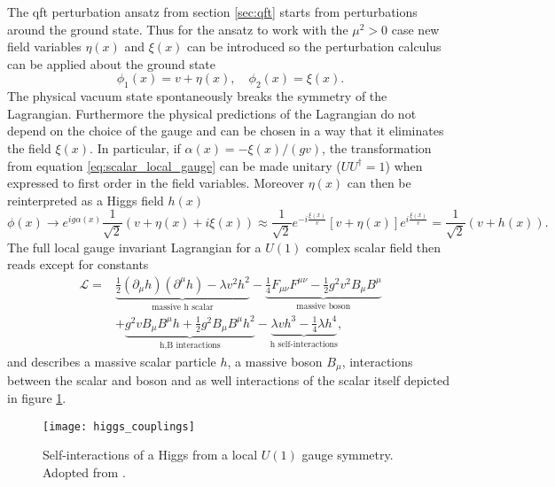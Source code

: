 The \ac{qft} perturbation ansatz from section \ref{sec:qft} starts from perturbations around the ground state. Thus for the ansatz to work with the $\mu^2>0$ case new field variables $\eta(x)$ and $\xi(x)$ can be introduced so the perturbation calculus can be applied about the ground state
\begin{equation}
    \phi_1(x)=v+\eta(x),\quad \phi_2(x)=\xi(x).
\end{equation}
The physical vacuum state spontaneously breaks the symmetry of the Lagrangian. Furthermore the physical predictions of the Lagrangian do not depend on the choice of the gauge and can be chosen in a way that it eliminates the field $\xi (x)$. In particular, if $\alpha(x)=-\xi(x)/(gv)$, the transformation from equation \ref{eq:scalar_local_gauge} can be made unitary ($UU^\dagger=1$) when expressed to first order in the field variables. Moreover $\eta(x)$ can then be reinterpreted as a Higgs field $h(x)$
\begin{equation}
    \phi(x)  \rightarrow  e^{i g\alpha(x)}\frac{1}{\sqrt{2}}(v+\eta(x)+i\xi(x))
    \approx
    \frac{1}{\sqrt{2}}e^{-i \frac{\xi(x)}{v}}[v+\eta(x)]e^{i\frac{\xi(x)}{v}}
    =
    \frac{1}{\sqrt{2}}(v+h(x)).
\end{equation}
The full local gauge invariant Lagrangian for a $U(1)$ complex scalar field then reads except for constants
\begin{align}
    \mathcal{L}= &
    \underbrace{\frac{1}{2}(\partial_\mu h)(\partial^\mu h)-\lambda v^2 h^2}_{\text{massive h scalar}}
    -
    \underbrace{\frac{1}{4}F_{\mu\nu}F^{\mu\nu} -\frac{1}{2}g^2v^2 B_\mu B^\mu}_{\text{massive boson}}
    \nonumber
    \\
                 & + \underbrace{g^2vB_\mu B^\mu h+\frac{1}{2}g^2 B_\mu B^\mu h^2}_{\text{h,B interactions}}
    -
    \underbrace{\lambda v h^3 -\frac{1}{4}\lambda h^4}_{\text{h self-interactions}},
\end{align}
and describes a massive scalar particle $h$, a massive boson $B_\mu$, interactions between the scalar and boson and as well interactions of the scalar itself depicted in figure \ref{fig:higgs_couplings}.
\begin{figure}
    \centering
    \texttt{[image: higgs\_couplings]}
    \caption[]{Self-interactions of a Higgs from a local $U(1)$ gauge symmetry. Adopted from \citep{thomson2013modern}.}
    \label{fig:higgs_couplings}
\end{figure}

